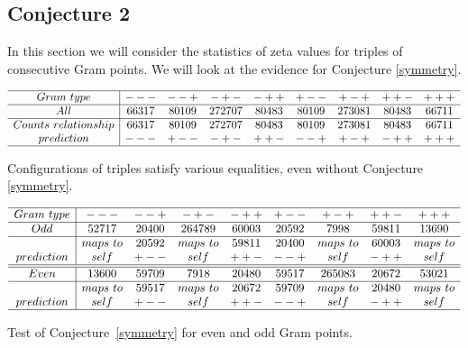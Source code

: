 \documentclass[twoside]{article}
\begin{document}
\subsection{\label{sec4b}Conjecture 2}
In this section we will consider the statistics of zeta values for triples of consecutive Gram points. We will look at the evidence for  Conjecture \ref{symmetry}.

\begin{table}
\centering \(\begin{array}{c|cccccccc}
\hline
 Gram~type&   ---   & --+       & -+-      & -++   &   +--      & +-+   & ++-   & +++ \\
\hline
 All &   66317& 80109& 272707& 80483& 80109& 273081& 80483& 66711\\
\hline
Counts~relationship&66317& 80109& 272707& 80483& 80109& 273081& 80483& 66711\\
prediction                            &  ---    & +--    & -+-       & ++-  & --+  & +-+ & -++ & +++  \\
\hline
\end{array}\)
\caption{Configurations of triples satisfy various equalities, even without Conjecture \ref{symmetry}.} \label{tab:tripletest}
\end{table}

\begin{table}
\centering \(\begin{array}{c|cccccccc}
\hline
 Gram~type&   ---        & --+       & -+-          & -++          &   +--           & +-+   & ++-   & +++ \\
\hline
Odd & 52717& 20400& 264789& 60003& 20592& 7998& 59811& 13690 \\
\hline
 &maps~to& 20592& maps~to& 59811& 20400& maps~to& 60003& maps~to \\ 
prediction   &  self         & +--       &  self        & ++-       & --+       & self        & -++      & self  \\
\hline
\hline
Even & 13600& 59709& 7918& 20480& 59517& 265083& 20672& 53021 \\
\hline
 &maps~to& 59517& maps~to& 20672& 59709& maps~to& 20480& maps~to \\  
prediction   &  self         & +--       &  self        & ++-       & --+       & self        & -++      & self  \\
\hline
\end{array}\)
\caption{Test of Conjecture~\ref{symmetry} for  even and odd Gram points.} \label{tab:tripletestcomplexity}
\end{table}
\end{document}
